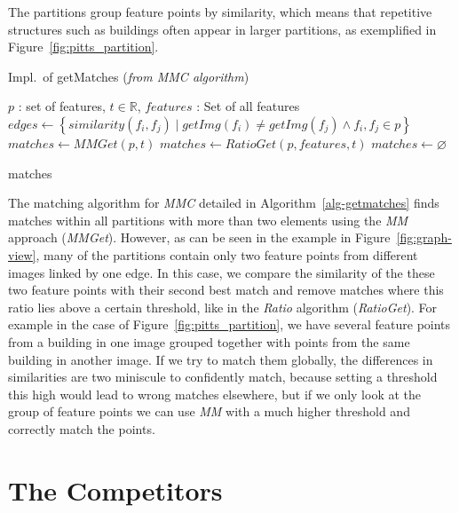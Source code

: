 The partitions group feature points by similarity, which means that 
repetitive structures such as buildings often appear in larger 
partitions, as exemplified in Figure~\ref{fig:pitts_partition}.

\begin{algorithm}[t]
\caption{Impl.\ of getMatches (\emph{from MMC algorithm})}
\label{alg-getmatches}
{\fontsize{11}{11}\selectfont
    \begin{algorithmic}
    \Require $p$ : set of features, $t\in \mathbb{R}$, $features$ : Set of 
    all features
    \State $edges \gets \left\{similarity(f_i, f_j) \mid getImg(f_i)
        \neq getImg(f_j) \wedge f_i, f_j \in p \right\}$
        \State $matches \gets MMGet(p, t)$
        \State $matches \gets RatioGet(p, features, t)$
    \Else
        \State $matches \gets \varnothing$
    \EndIf

    \Return matches
    \end{algorithmic}
}
\end{algorithm}

The matching algorithm for \emph{MMC} detailed in 
Algorithm~\ref{alg-getmatches} finds matches within all partitions with 
more than two elements using the \emph{MM} approach (\emph{MMGet}).  
However, as can be seen in the example in Figure~\ref{fig:graph-view}, 
many of the partitions contain only two feature points from different 
images linked by one edge. In this case, we compare the similarity of 
the these two feature points with their second best match and remove 
matches where this ratio lies above a certain threshold, like in the 
\emph{Ratio} algorithm (\emph{RatioGet}).  For example in the case of 
Figure~\ref{fig:pitts_partition}, we have several feature points from a 
building in one image grouped together with points from the same 
building in another image. If we try to match them globally, the 
differences in similarities are two miniscule to confidently match, 
because setting a threshold this high would lead to wrong matches 
elsewhere, but if we only look at the group of feature points we can use 
\emph{MM} with a much higher threshold and correctly match the points.

\section{The Competitors}


